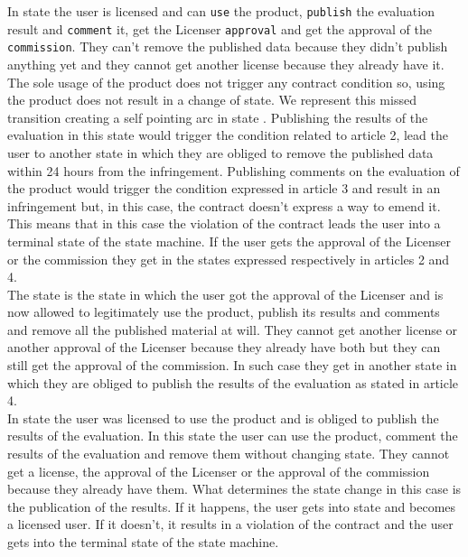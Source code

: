 \documentclass{scrbook}
\newcommand*\circled[1]{\tikz[baseline=(char.base)]{
            \node[shape=circle,draw,inner sep=2pt] (char) {#1};}}
\begin{document}
In state \circled{2} the user is licensed and can \texttt{use} the product, \texttt{publish} the evaluation result and \texttt{comment} it, get the Licenser \texttt{approval} and get the approval of the \texttt{commission}. They can't remove the published data because they didn't publish anything yet and they cannot get another license because they already have it. The sole usage of the product does not trigger any contract condition so, using the product does not result in a change of state. We represent this missed transition creating a self pointing arc in state \circled{2}. Publishing the results of the evaluation in this state would trigger the condition related to article 2, lead the user to another state in which they are obliged to remove the published data within 24 hours from the infringement. Publishing comments on the evaluation of the product would trigger the condition expressed in article 3 and result in an infringement but, in this case, the contract doesn't express a way to emend it. This means that in this case the violation of the contract leads the user into a terminal state of the state machine. If the user gets the approval of the Licenser or the commission they get in the states expressed respectively in articles 2 and 4. \\

The state \circled{3} is the state in which the user got the approval of the Licenser and is now allowed to legitimately use the product, publish its results and comments and remove all the published material at will. They cannot get another license or another approval of the Licenser because they already have both but they can still get the approval of the commission. In such case they get in another state in which they are obliged to publish the results of the evaluation as stated in article 4. \\

In state \circled{4} the user was licensed to use the product and is obliged to publish the results of the evaluation. In this state the user can use the product, comment the results of the evaluation and remove them without changing state. They cannot get a license, the approval of the Licenser or the approval of the commission because they already have them. What determines the state change in this case is the publication of the results. If it happens, the user gets into state \circled{3} and becomes a licensed user. If it doesn't, it results in a violation of the contract and the user gets into the terminal state of the state machine. \\
\end{document}
